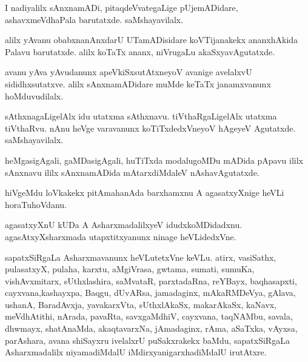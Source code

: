 \documentclass{article}
\begin{document}
\begin{mn}
I nadiyalilx  sAnxnamADi,  pitaqdeVvategaLige  pUjemADidare,  ashavxmeVdhaPala  
barutatxde.  saMshayavilalx.
\end{mn}

\begin{mn}
alilx  yAvanu  obabxnanAnxdarU  UTamADisidare  koVTijanakekx  ananxhAkida  
Palavu  barutatxde.  alilx  koTaTx  ananx,  niVrugaLu  akaSxyavAgutatxde.
\end{mn}

\begin{mn}
avanu  yAva yAvudanunx  apeVkiSxsutAtxneyoV  avanige  avelalxvU  sididhxsutatxve.  
alilx  sAnxnamADidare  muMde  keTaTx  janamxvanunx  hoMduvudilalx.
\end{mn}

\begin{mn}
sAthxnagaLigelAlx  idu  utatxma  sAthxnavu.  tiVthaRgaLigelAlx  utatxma  tiVthaRvu.  
nAnu  heVge  varavanunx  koTiTxdedxVneyoV  hAgeyeV  Agutatxde.  saMshayavilalx.
\end{mn}

\begin{mn}
heMgasigAgali,  gaMDasigAgali,  huTiTxda  modalugoMDu  mADida  pApavu  ililx  
sAnxnavu  ililx  sAnxnamADida  mAtarxdiMdaleV  nAshavAgutatxde.
\end{mn}

\begin{mn}
hiVgeMdu  loVkakekx  pitAmahanAda  barxhamxnu  A  agasatxyXnige  heVLi  horaTuhoVdanu.
\end{mn}

\begin{mn}
agasatxyXnU  kUDa  A  AsharxmadalilxyeV  idudxkoMDidadxnu.  agasAtxyXsharxmada  
utapxtitxyanunx  ninage  heVLidedxVne.
\end{mn}

\begin{mn}
sapatxSiRgaLa  Asharxmavanunx  heVLutetxVne  keVLu.  atirx,  vasiSathx,  pulasatxyX,  
pulaha,  karxtu,  aMgiVrasa,  gwtama,  sumati,  sumuKa,  vishAvxmitarx,  sUthxlashira,  
saMvataR,  parxtadaRna,  reYBayx,  baqhasapxti, cayxvana,kashayxpa,  Baqgu,  dUvARsa,  
jamadaginx,  mAkaRMDeVya,  gAlava,  ushanA,  BaradAvxja,  yavakarxVta,  sUthxlAkaSx,  
makarAkaSx,  kaNavx,  meVdhAtithi,  nArada,  pavaRta,  savxgaMdhiV,  cayxvana,  
taqNAMbu,  savala,  dhwmayx,  shatAnaMda,  akaqtavarxNa,  jAmadaginx,  rAma,  aSaTxka,  
vAyxsa,  parAshara,  avana  shiSayxru  ivelalxrU  puSakxrakekx  baMdu,  sapatxSiRgaLa  
Asharxmadalilx  niyamadiMdalU  iMdirxyanigarxhadiMdalU  irutAtxre.
\end{mn}
\end{document}
